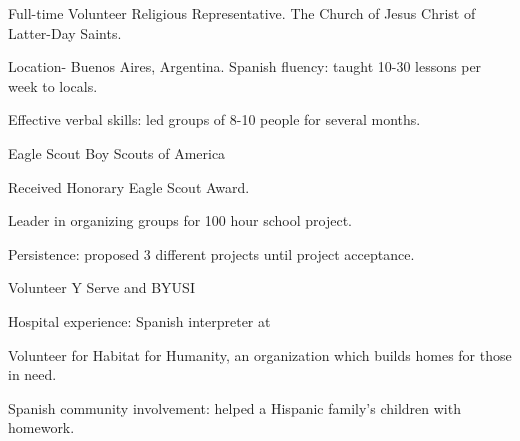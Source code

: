 \begin{cventries}
  \cventry
    {Full-time Volunteer Religious Representative.}
    {The Church of Jesus Christ of Latter-Day Saints.}
    {}
    {}
    {
      \begin{cvitems}
        \item {Location- Buenos Aires, Argentina. Spanish fluency: taught 10-30 lessons per week to locals.}
        \item {Effective verbal skills: led groups of 8-10 people for several months.}
      \end{cvitems}
    }
      \cventry
    {Eagle Scout}
    {Boy Scouts of America}
    {}
    {}
    {
      \begin{cvitems}
        \item{Received Honorary Eagle Scout Award.}
        \item{Leader in organizing groups for 100 hour school project.}
       \item{Persistence: proposed 3 different projects until project acceptance. }
      \end{cvitems}
    }
       \cventry
    {Volunteer}
    {Y Serve and BYUSI}
    {}
    {}
    {
      \begin{cvitems}
              \item {Hospital experience: Spanish interpreter at }
        \item {Volunteer for Habitat for Humanity, an organization which builds homes for those in need.}
        \item {Spanish community involvement: helped a Hispanic family's children with homework.}
      \end{cvitems}
    }
\end{cventries}
